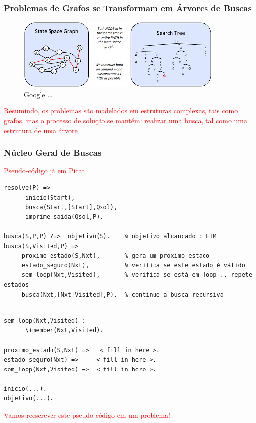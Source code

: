 \begin{frame}[fragile]
\frametitle{Problemas de Grafos se Transformam em Árvores de Buscas}

\begin{figure}[!htb]
\centering
\includegraphics[width=.99\textwidth, height=0.55\textheight]{figures/espaco-estado-arvore.jpg}
\caption{Google ...}
\end{figure}

\textcolor{red}{Resumindo, os problemas são modelados  em 
estruturas  complexas, tais como grafos, mas o processo de solução
se mantém: realizar uma busca, tal como uma estrutura de uma árvore }

\end{frame}




\begin{frame}[fragile, allowframebreaks=0.9]
  \frametitle{Núcleo Geral de Buscas}



\textcolor{red}{Pseudo-código já em Picat}

\begin{verbatim}
resolve(P) =>
      inicio(Start),
      busca(Start,[Start],Qsol),
      imprime_saida(Qsol,P).

busca(S,P,P) ?=>  objetivo(S).    % objetivo alcancado : FIM    
busca(S,Visited,P) =>
     proximo_estado(S,Nxt),       % gera um proximo estado  
     estado_seguro(Nxt),          % verifica se este estado é válido 
     sem_loop(Nxt,Visited),       % verifica se está em loop .. repete estados 
     busca(Nxt,[Nxt|Visited],P).  % continue a busca recursiva 
\end{verbatim}


\framebreak


\begin{verbatim}

sem_loop(Nxt,Visited) :-
      \+member(Nxt,Visited).

proximo_estado(S,Nxt) =>   < fill in here >.
estado_seguro(Nxt) =>     < fill in here >.
sem_loop(Nxt,Visited) =>  < fill in here >.     
                       
inicio(...).
objetivo(...).

\end{verbatim}


\textcolor{red}{Vamos reescrever este pseudo-código em um problema!}


\end{frame}


